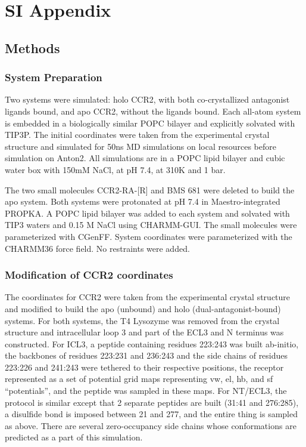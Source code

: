 
\section{SI Appendix}
\subsection{Methods}
\subsubsection{System Preparation}
Two systems were simulated: holo CCR2, with both co-crystallized antagonist ligands bound, and apo CCR2, without the ligands bound. Each all-atom system is embedded in a biologically similar POPC bilayer and explicitly solvated with TIP3P. The initial coordinates were taken from the experimental crystal structure\cite{Zheng2016} and simulated for 50ns MD simulations on local resources before simulation on Anton2. All simulations are in a POPC lipid bilayer and cubic water box with 150mM NaCl, at pH 7.4, at 310K and 1 bar.

The two small molecules CCR2-RA-[R]\cite{Zheng2016,Dasse2007} and BMS 681\cite{Zheng2016,Carter2015} were deleted to build the apo system. Both systems were protonated at pH 7.4 in Maestro-integrated PROPKA. A POPC lipid bilayer was added to each system and solvated with TIP3 waters and 0.15 M NaCl using CHARMM-GUI\cite{Jo2008}. The small molecules were parameterized with CGenFF\cite{Vanommeslaeghe2010}. System coordinates were parameterized with the CHARMM36\cite{Huang2013} force field. No restraints were added.

\subsubsection{Modification of CCR2 coordinates}
The coordinates for CCR2 were taken from the experimental crystal structure \cite{Zheng2016} and modified to build the apo (unbound) and holo (dual-antagonist-bound) systems. For both systems, the T4 Lysozyme was removed from the crystal structure and intracellular loop 3 and part of the ECL3 and N terminus was constructed. For ICL3, a peptide containing residues 223:243 was built ab-initio, the backbones of residues 223:231 and 236:243 and the side chains of residues 223:226 and 241:243 were tethered to their respective positions, the receptor represented as a set of potential grid maps representing vw, el, hb, and sf ``potentials'', and the peptide was sampled in these maps. For NT/ECL3, the protocol is similar except that 2 separate peptides are built (31:41 and 276:285), a disulfide bond is imposed between 21 and 277, and the entire thing is sampled as above. There are several zero-occupancy side chains whose conformations are predicted as a part of this simulation.

